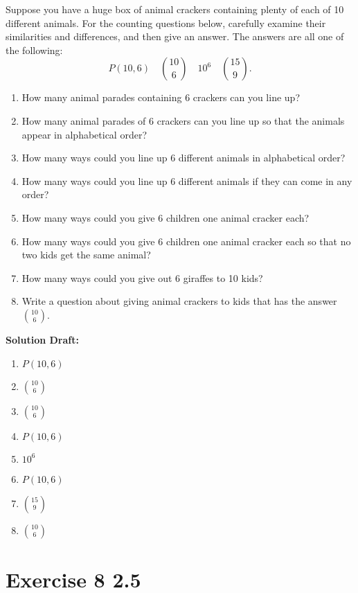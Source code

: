 \documentclass{article}
\begin{document}
Suppose you have a huge box of animal crackers containing plenty of each of 10 different animals. For the counting questions below, carefully examine their similarities and differences, and then give an answer. The answers are all one of the following:
\[
P(10,6) \quad \binom{10}{6} \quad 10^6 \quad \binom{15}{9}.
\]

\begin{enumerate}
    \item How many animal parades containing 6 crackers can you line up?
    \item How many animal parades of 6 crackers can you line up so that the animals appear in alphabetical order?
    \item How many ways could you line up 6 different animals in alphabetical order?
    \item How many ways could you line up 6 different animals if they can come in any order?
    \item How many ways could you give 6 children one animal cracker each?
    \item How many ways could you give 6 children one animal cracker each so that no two kids get the same animal?
    \item How many ways could you give out 6 giraffes to 10 kids?
    \item Write a question about giving animal crackers to kids that has the answer \(\binom{10}{6}\).
\end{enumerate}

\vspace{0.5cm}
\noindent\textbf{Solution Draft:} 
\vspace{0.2cm}

\begin{enumerate}
    \item $P(10,6)$
    \item $\binom{10}{6}$
    \item $\binom{10}{6}$
    \item $P(10,6)$
    \item $10^{6}$
    \item $P(10,6)$
    \item $\binom{15}{9}$
    \item $\binom{10}{6}$

\end{enumerate}


\section*{Exercise 8 2.5}  
\end{document}
